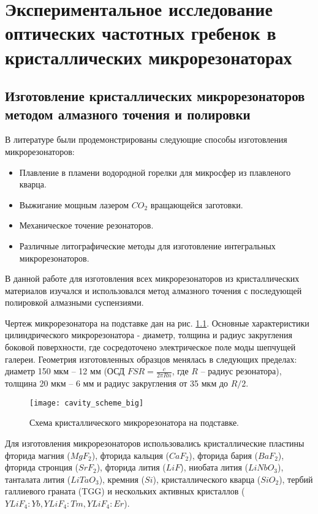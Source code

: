 \chapter{Экспериментальное исследование оптических частотных гребенок в кристаллических микрорезонаторах} \label{chapt3}

\section{Изготовление кристаллических микрорезонаторов методом алмазного точения и полировки}

В литературе были продемонстрированы следующие способы изготовления микрорезонаторов:

\begin{itemize}
  \item Плавление в пламени водородной горелки для микросфер из плавленого кварца.
  \item Выжигание мощным лазером $CO_2$ вращающейся заготовки.
  \item Механическое точение резонаторов.
  \item Различные литографические методы для изготовление интегральных микрорезонаторов.
\end{itemize}

В данной работе для изготовления всех микрорезонаторов из кристаллических материалов изучался и использовался метод алмазного точения с последующей полировкой алмазными суспензиями.

Чертеж микрорезонатора на подставке дан на рис. \ref{cavity_scheme_big}. Основные характеристики цилиндрического микрорезонатора - диаметр, толщина и радиус закругления боковой поверхности, где сосредоточено электрическое поле моды шепчущей галереи. Геометрия изготовленных образцов менялась в следующих пределах: диаметр 150 мкм – 12 мм (ОСД $FSR= \frac{c}{2\pi Rn}$, где $R$ – радиус резонатора), толщина 20 мкм – 6 мм и радиус закругления от 35 мкм до $R/2$.

\begin{figure}[ht]
    \centering
  \texttt{[image: cavity\_scheme\_big]}
  \caption{Схема кристаллического микрорезонатора на подставке.}
  \label{cavity_scheme_big}
\end{figure}

Для изготовления микрорезонаторов использовались кристаллические пластины фторида магния ($MgF_2$), фторида кальция ($CaF_2$), фторида бария ($BaF_2$), фторида стронция ($SrF_2$), фторида лития ($LiF$), ниобата лития ($LiNbO_3$), танталата лития ($LiTaO_3$), кремния ($Si$), кристаллического кварца ($SiO_2$), тербий галлиевого граната (TGG) и нескольких активных кристаллов ($YLiF_4:Yb, YLiF_4:Tm, YLiF_4:Er$).

